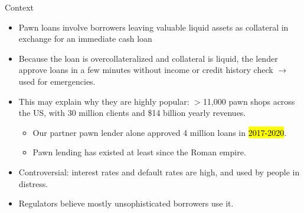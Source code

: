 \documentclass[8pt]{beamer}
\begin{document}
\begin{frame}{Context}
\begin{itemize}
    \vfill \item Pawn loans involve borrowers leaving valuable liquid assets as collateral in exchange for an immediate cash loan
    \vfill \item Because the loan is overcollateralized and collateral is liquid, the lender approve loans in a few minutes without income or credit history check $\rightarrow$ used for emergencies.
    \vfill \item This may explain why they are highly popular: $>$11,000 pawn shops across the US, with 30 million clients and \$14 billion yearly revenues.
    \begin{itemize}
        \item Our partner pawn lender alone approved 4 million loans in \hl{2017-2020}.
        \item Pawn lending has existed at least since the Roman empire.
    \end{itemize} 
    \vfill \item Controversial: interest rates and default rates are high, and used by people in distress.
    \vfill \item Regulators believe mostly unsophisticated borrowers use it.
\end{itemize}
\end{frame}
\end{document}
